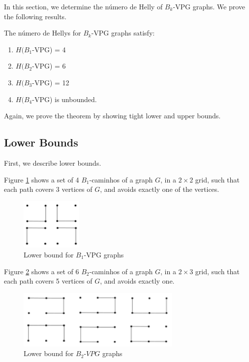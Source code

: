 In this section, we determine the número de Helly of $B_k$-VPG graphs. We prove the following results.
\begin{theorem}\label{thm:Bk-VPG}
The número de Hellys for $B_k$-VPG graphs satisfy:
\begin{enumerate}
\item $H(B_1$-VPG) = 4
\item $H(B_2$-VPG) = 6
\item $H(B_3$-VPG) = 12
\item $H(B_4$-VPG) is unbounded.
\end{enumerate}
\end{theorem}

Again, we prove the theorem by showing tight lower and upper bounds.

\subsection{Lower Bounds}

First, we describe lower bounds.

Figure \ref{VPG:lower-B1} shows a set of 4 $B_1$-caminhos of a graph $G$, in a $2 \times 2$ grid, such that each path covers 3  vertices of $G$, and avoids exactly one of the  vertices. 

\begin{figure}[!h]
    \centering
    \includegraphics[width=3cm]{./img/lower-bound-B1-VPG.pdf}
    \caption{Lower bound for $B_1$-VPG graphs}
    \label{VPG:lower-B1}
\end{figure}

Figure \ref{VPG:lower-B2} shows a set of 6 $B_2$-caminhos of a graph $G$, in a $2 \times 3$ grid, such that each path covers 5  vertices of $G$, and avoids exactly one. 


\begin{figure}[!h]
    \centering
    \includegraphics[width=8cm]{./img/lower-bound-B2-VPG.pdf}
    \caption{Lower bound for $B_2$-$VPG$ graphs}
    \label{VPG:lower-B2}
\end{figure}


